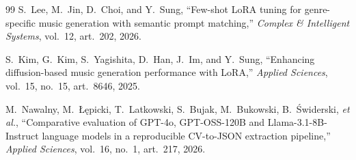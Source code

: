 \documentclass[11pt]{article}
\begin{document}
\begin{thebibliography}{99}
S.~Lee, M.~Jin, D.~Choi, and Y.~Sung, ``Few-shot LoRA tuning for genre-specific music generation with semantic prompt matching,'' \emph{Complex \& Intelligent Systems}, vol.~12, art.~202, 2026.

S.~Kim, G.~Kim, S.~Yagishita, D.~Han, J.~Im, and Y.~Sung, ``Enhancing diffusion-based music generation performance with LoRA,'' \emph{Applied Sciences}, vol.~15, no.~15, art.~8646, 2025.

M.~Nawalny, M.~{\L}\k{e}picki, T.~Latkowski, S.~Bujak, M.~Bukowski, B.~{\'S}widerski, \emph{et al.}, ``Comparative evaluation of GPT-4o, GPT-OSS-120B and Llama-3.1-8B-Instruct language models in a reproducible CV-to-JSON extraction pipeline,'' \emph{Applied Sciences}, vol.~16, no.~1, art.~217, 2026.

\end{thebibliography}
\end{document}
